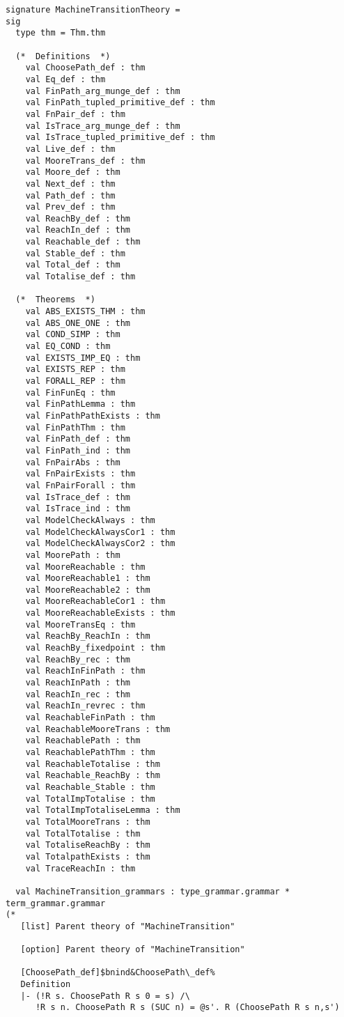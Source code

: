 \documentclass[12pt]{article}
\begin{document}
\begin{footnotesize}
\begin{Verbatim}[commandchars=\$\&\%]
signature MachineTransitionTheory =
sig
  type thm = Thm.thm
  
  (*  Definitions  *)
    val ChoosePath_def : thm
    val Eq_def : thm
    val FinPath_arg_munge_def : thm
    val FinPath_tupled_primitive_def : thm
    val FnPair_def : thm
    val IsTrace_arg_munge_def : thm
    val IsTrace_tupled_primitive_def : thm
    val Live_def : thm
    val MooreTrans_def : thm
    val Moore_def : thm
    val Next_def : thm
    val Path_def : thm
    val Prev_def : thm
    val ReachBy_def : thm
    val ReachIn_def : thm
    val Reachable_def : thm
    val Stable_def : thm
    val Total_def : thm
    val Totalise_def : thm
  
  (*  Theorems  *)
    val ABS_EXISTS_THM : thm
    val ABS_ONE_ONE : thm
    val COND_SIMP : thm
    val EQ_COND : thm
    val EXISTS_IMP_EQ : thm
    val EXISTS_REP : thm
    val FORALL_REP : thm
    val FinFunEq : thm
    val FinPathLemma : thm
    val FinPathPathExists : thm
    val FinPathThm : thm
    val FinPath_def : thm
    val FinPath_ind : thm
    val FnPairAbs : thm
    val FnPairExists : thm
    val FnPairForall : thm
    val IsTrace_def : thm
    val IsTrace_ind : thm
    val ModelCheckAlways : thm
    val ModelCheckAlwaysCor1 : thm
    val ModelCheckAlwaysCor2 : thm
    val MoorePath : thm
    val MooreReachable : thm
    val MooreReachable1 : thm
    val MooreReachable2 : thm
    val MooreReachableCor1 : thm
    val MooreReachableExists : thm
    val MooreTransEq : thm
    val ReachBy_ReachIn : thm
    val ReachBy_fixedpoint : thm
    val ReachBy_rec : thm
    val ReachInFinPath : thm
    val ReachInPath : thm
    val ReachIn_rec : thm
    val ReachIn_revrec : thm
    val ReachableFinPath : thm
    val ReachableMooreTrans : thm
    val ReachablePath : thm
    val ReachablePathThm : thm
    val ReachableTotalise : thm
    val Reachable_ReachBy : thm
    val Reachable_Stable : thm
    val TotalImpTotalise : thm
    val TotalImpTotaliseLemma : thm
    val TotalMooreTrans : thm
    val TotalTotalise : thm
    val TotaliseReachBy : thm
    val TotalpathExists : thm
    val TraceReachIn : thm
  
  val MachineTransition_grammars : type_grammar.grammar * term_grammar.grammar
(*
   [list] Parent theory of "MachineTransition"
   
   [option] Parent theory of "MachineTransition"
   
   [ChoosePath_def]$bnind&ChoosePath\_def%
   Definition
   |- (!R s. ChoosePath R s 0 = s) /\
      !R s n. ChoosePath R s (SUC n) = @s'. R (ChoosePath R s n,s')
   

\end{Verbatim}
\end{footnotesize}
\end{document}
